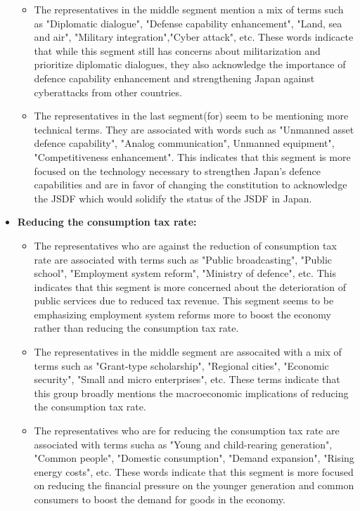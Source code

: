 \documentclass[final,5p,times,twocolumn,authoryear]{elsarticle}
\begin{document}
\begin{itemize}
\begin{itemize}
			\item The representatives in the middle segment mention a mix of terms such as "Diplomatic dialogue", "Defense capability enhancement", "Land, sea and air", "Military integration","Cyber attack", etc. These words indicacte that while this segment still has concerns about militarization and prioritize diplomatic dialogues, they also acknowledge the importance of defence capability enhancement and strengthening Japan against cyberattacks from other countries. 
			\item The representatives in the last segment(for) seem to be mentioning more technical terms. They are associated with words such as "Unmanned asset defence capability", "Analog communication", Unmanned equipment", "Competitiveness enhancement". This indicates that this segment is more focused on the technology necessary to strengthen Japan's defence capabilities and are in favor of changing the constitution to acknowledge the JSDF which would solidify the status of the JSDF in Japan.
		\end{itemize}
	\item \textbf{Reducing the consumption tax rate:}
	\begin{itemize}
		\item The representatives who are against the reduction of consumption tax rate are associated with terms such as "Public broadcasting", "Public school", "Employment system reform", "Ministry of defence", etc. This indicates that this segment is more concerned about the deterioration of public services due to reduced tax revenue. This segment seems to be emphasizing employment system reforms more to boost the economy rather than reducing the consumption tax rate.
		\item The representatives in the middle segment are assocaited with a mix of terms such as "Grant-type scholarship", "Regional cities", "Economic security", "Small and micro enterprises", etc. These terms indicate that this group broadly mentions the macroeconomic implications of reducing the consumption tax rate.
		\item The representatives who are for reducing the consumption tax rate are associated with terms sucha as "Young and child-rearing generation", "Common people", "Domestic consumption", "Demand expansion", "Rising energy costs", etc. These words indicate that this segment is more focused on reducing the financial pressure on the younger generation and common consumers to boost the demand for goods in the economy. 
	\end{itemize}
\end{itemize}
\end{document}
